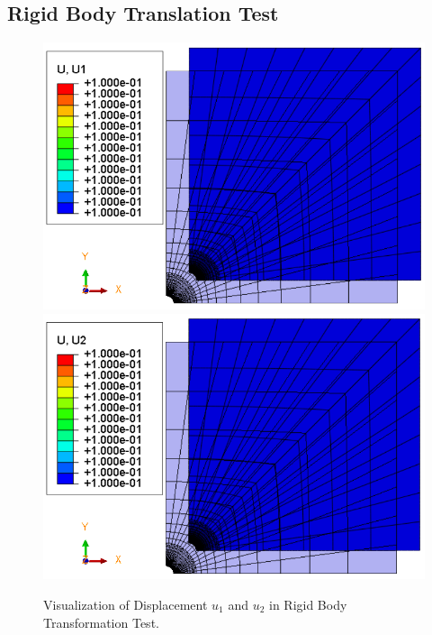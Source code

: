 \documentclass[12pt]{article}
\begin{document}
\subsection{Rigid Body Translation Test}
\begin{figure}[H]
	\begin{center}
		\includegraphics[scale=0.49]{Rigid_body_u1_crop.png} 
	    \includegraphics[scale=0.49]{Rigid_body_u2_crop.png} 
	\end{center}
	\caption{Visualization of Displacement $u_1 $ and $u_2 $ in Rigid Body Transformation Test.} 
\end{figure}
\end{document}
